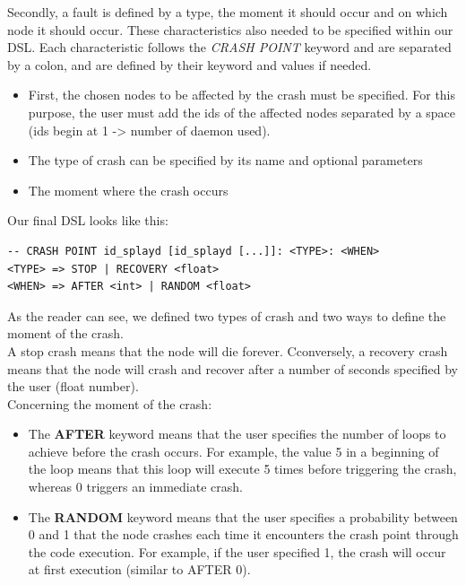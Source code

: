 \documentclass{eplmastersthesis}
\begin{document}
        Secondly, a fault is defined by a type, the moment it should occur and
        on which node it should occur. These characteristics also needed to
        be specified within our DSL. Each characteristic follows the
        \textit{CRASH POINT} keyword and are separated by a colon, and are
        defined by their keyword and values if needed.

        \begin{itemize}
          \item First, the chosen nodes to be affected by the crash must be
          specified. For this purpose, the user must add the ids of the
          affected nodes separated by a space (ids begin at 1 -> number of
          daemon used).
          \item The type of crash can be specified by its name and optional
          parameters
          \item The moment where the crash occurs
        \end{itemize}

        Our final DSL looks like this:

        \begin{lstlisting}[style=MyBash]
-- CRASH POINT id_splayd [id_splayd [...]]: <TYPE>: <WHEN>
<TYPE> => STOP | RECOVERY <float>
<WHEN> => AFTER <int> | RANDOM <float>
        \end{lstlisting}

        As the reader can see, we defined two types of crash and two ways to
        define the moment of the crash.\\
        A stop crash means that the node will die forever. Cconversely, a
        recovery crash means that the node will crash and recover after a
        number of seconds specified by the user (float number).\\
        Concerning the moment of the crash:

        \begin{itemize}
          \item The \textbf{AFTER} keyword means that the user specifies the
          number of loops to achieve before the crash occurs. For example,
          the value 5 in a beginning of the loop means that this loop will
          execute 5 times before triggering the crash, whereas 0 triggers
          an immediate crash.
          \item The \textbf{RANDOM} keyword means that the user specifies a
          probability between 0 and 1 that the node crashes each time it
          encounters the crash point through the code execution. For example,
          if the user specified 1, the crash will occur at first execution
          (similar to AFTER 0).
        \end{itemize}
\end{document}
